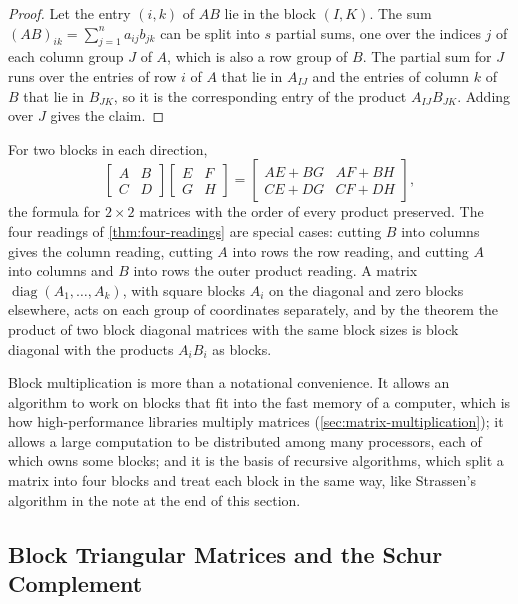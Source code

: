 \begin{proof}
Let the entry $(i,k)$ of $AB$ lie in the block $(I,K)$. The sum $(AB)_{ik}=\sum_{j=1}^na_{ij}b_{jk}$ can be split into $s$ partial sums, one over the indices $j$ of each column group $J$ of $A$, which is also a row group of $B$. The partial sum for $J$ runs over the entries of row $i$ of $A$ that lie in $A_{IJ}$ and the entries of column $k$ of $B$ that lie in $B_{JK}$, so it is the corresponding entry of the product $A_{IJ}B_{JK}$. Adding over $J$ gives the claim.
\end{proof}

For two blocks in each direction,
\[
\begin{bmatrix}A&B\\C&D\end{bmatrix}\begin{bmatrix}E&F\\G&H\end{bmatrix}=\begin{bmatrix}AE+BG&AF+BH\\CE+DG&CF+DH\end{bmatrix},
\]
the formula for $2\times2$ matrices with the order of every product preserved. The four readings of \cref{thm:four-readings} are special cases: cutting $B$ into columns gives the column reading, cutting $A$ into rows the row reading, and cutting $A$ into columns and $B$ into rows the outer product reading. A  matrix $\operatorname{diag}(A_1,\ldots,A_k)$, with square blocks $A_i$ on the diagonal and zero blocks elsewhere, acts on each group of coordinates separately, and by the theorem the product of two block diagonal matrices with the same block sizes is block diagonal with the products $A_iB_i$ as blocks.

Block multiplication is more than a notational convenience. It allows an algorithm to work on blocks that fit into the fast memory of a computer, which is how high-performance libraries multiply matrices (\cref{sec:matrix-multiplication}); it allows a large computation to be distributed among many processors, each of which owns some blocks; and it is the basis of recursive algorithms, which split a matrix into four blocks and treat each block in the same way, like Strassen's algorithm in the note at the end of this section.

\subsection{Block Triangular Matrices and the Schur Complement}


